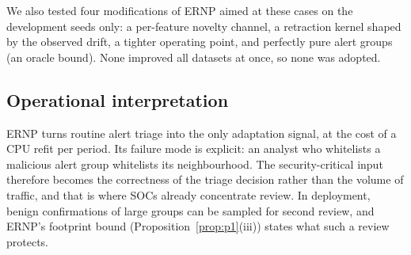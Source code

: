 \documentclass[a4paper,fleqn]{cas-dc}
\newcommand{\ERNP}{ERNP\xspace}
\begin{document}
We also tested four modifications of \ERNP aimed at these cases on the development seeds only: a per-feature novelty channel, a retraction kernel shaped by the observed drift, a tighter operating point, and perfectly pure alert groups (an oracle bound). None improved all datasets at once, so none was adopted.

\subsection{Operational interpretation}
\ERNP turns routine alert triage into the only adaptation signal, at the cost of a CPU refit per period. Its failure mode is explicit: an analyst who whitelists a malicious alert group whitelists its neighbourhood. The security-critical input therefore becomes the correctness of the triage decision rather than the volume of traffic, and that is where SOCs already concentrate review. In deployment, benign confirmations of large groups can be sampled for second review, and \ERNP's footprint bound (Proposition~\ref{prop:p1}(iii)) states what such a review protects.

\end{document}
